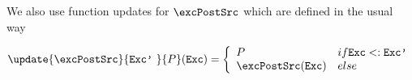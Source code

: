 We also use  function updates for $\excPostSrc$ which are defined in the usual way


$$
\update{\excPostSrc}{\mbox{\rm\texttt{Exc'} }}{ P }( \mbox{\rm\texttt{Exc}} )  = 
       \left\{\begin{array}{ll} 
         P & if \mbox{\rm\texttt{Exc}}  <: \mbox{\rm\texttt{Exc'}}  \\
         \excPostSrc(\mbox{\rm\texttt{Exc}} ) & else 
     \end{array}\right.$$



